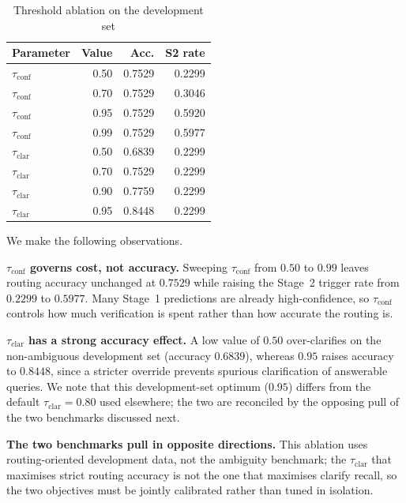 \begin{table}[!htbp]
\centering
\caption{Threshold ablation on the development set}\label{tab:threshold_ablation}
\begin{tabular}{lrrr}
\toprule
\textbf{Parameter} & \textbf{Value} & \textbf{Acc.} & \textbf{S2 rate} \\
\midrule
$\tau_{\mathrm{conf}}$ & 0.50 & 0.7529 & 0.2299 \\
$\tau_{\mathrm{conf}}$ & 0.70 & 0.7529 & 0.3046 \\
$\tau_{\mathrm{conf}}$ & 0.95 & 0.7529 & 0.5920 \\
$\tau_{\mathrm{conf}}$ & 0.99 & 0.7529 & 0.5977 \\
\midrule
$\tau_{\mathrm{clar}}$ & 0.50 & 0.6839 & 0.2299 \\
$\tau_{\mathrm{clar}}$ & 0.70 & 0.7529 & 0.2299 \\
$\tau_{\mathrm{clar}}$ & 0.90 & 0.7759 & 0.2299 \\
$\tau_{\mathrm{clar}}$ & 0.95 & 0.8448 & 0.2299 \\
\bottomrule
\end{tabular}
\end{table}

We make the following observations.

\noindent\textbf{$\tau_{\mathrm{conf}}$ governs cost, not accuracy.} Sweeping
$\tau_{\mathrm{conf}}$ from $0.50$ to $0.99$ leaves routing accuracy unchanged
at $0.7529$ while raising the Stage~2 trigger rate from $0.2299$ to $0.5977$.
Many Stage~1 predictions are already high-confidence, so $\tau_{\mathrm{conf}}$
controls how much verification is spent rather than how accurate the routing
is.

\noindent\textbf{$\tau_{\mathrm{clar}}$ has a strong accuracy effect.} A low
value of $0.50$ over-clarifies on the non-ambiguous development set (accuracy
$0.6839$), whereas $0.95$ raises accuracy to $0.8448$, since a stricter
override prevents spurious clarification of answerable queries. We note that
this development-set optimum ($0.95$) differs from the default
$\tau_{\mathrm{clar}}=0.80$ used elsewhere; the two are reconciled by the
opposing pull of the two benchmarks discussed next.

\noindent\textbf{The two benchmarks pull in opposite directions.} This ablation
uses routing-oriented development data, not the ambiguity benchmark; the
$\tau_{\mathrm{clar}}$ that maximises strict routing accuracy is not the one
that maximises clarify recall, so the two objectives must be jointly calibrated
rather than tuned in isolation.

